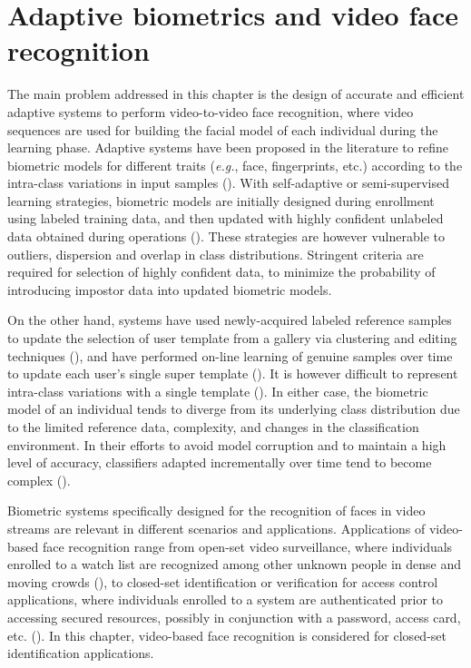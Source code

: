 \section{Adaptive biometrics and video face recognition}
\label{sec:c3_app}

The main problem addressed in this chapter is the design of accurate and efficient adaptive systems to perform video-to-video face recognition, where video sequences are used for building the facial model of each individual during the learning phase.
Adaptive systems have been proposed in the literature to refine biometric models for different traits (\emph{e.g.}, face, fingerprints, etc.) according to the intra-class variations in input samples (\cite{roli08}).
With self-adaptive or semi-supervised learning strategies, biometric models are initially designed during enrollment using labeled training data, and then updated with highly confident unlabeled data obtained during operations (\cite{poh09, rattani10}).
These strategies are however vulnerable to outliers, dispersion and overlap in class distributions.
Stringent criteria are required for selection of highly confident data, to minimize the probability of introducing impostor data into updated biometric models.

On the other hand, systems have used newly-acquired labeled reference samples to update the selection of user template from a gallery via clustering and editing techniques (\cite{uludag04}), and have performed on-line learning of genuine samples over time to update each user's single super template (\cite{jiang02}).
It is however difficult to represent intra-class variations with a single template (\cite{roli08}).
In either case, the biometric model of an individual tends to diverge from its underlying class distribution due to the limited reference data, complexity, and changes in the classification environment.
In their efforts to avoid model corruption and to maintain a high level of accuracy, classifiers adapted incrementally over time tend to become complex (\cite{connolly11}).

Biometric systems specifically designed for the recognition of faces in video streams are relevant in different scenarios and applications.
Applications of video-based face recognition range from open-set video surveillance, where individuals enrolled to a watch list are recognized among other unknown people in dense and moving crowds (\cite{ekenel09}), to closed-set identification or verification for access control applications, where individuals enrolled to a system are authenticated prior to accessing secured resources, possibly in conjunction with a password, access card, etc. (\cite{stallkamp07}).
In this chapter, video-based face recognition is considered for closed-set identification applications.

